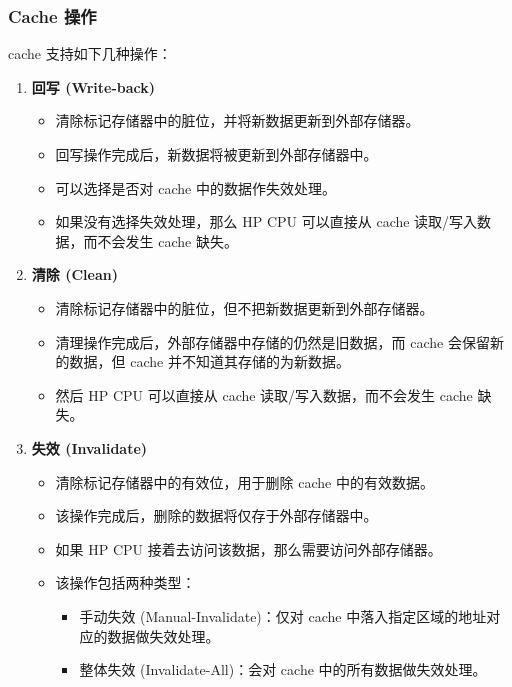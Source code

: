 \documentclass[main\_\_CN.tex]{subfiles}
\begin{document}
\subsubsection{Cache 操作}

\chipname{} cache 支持如下几种操作：

\begin{enumerate}
\item \textbf{回写 (Write-back)}
\begin{itemize}
    \item 清除标记存储器中的脏位，并将新数据更新到外部存储器。
    \item 回写操作完成后，新数据将被更新到外部存储器中。
    \item 可以选择是否对 cache 中的数据作失效处理。
    \item 如果没有选择失效处理，那么 HP CPU 可以直接从 cache 读取/写入数据，而不会发生 cache 缺失。
\end{itemize}

\item \textbf{清除 (Clean)}
\begin{itemize}
    \item 清除标记存储器中的脏位，但不把新数据更新到外部存储器。
    \item 清理操作完成后，外部存储器中存储的仍然是旧数据，而 cache 会保留新的数据，但 cache 并不知道其存储的为新数据。
    \item 然后 HP CPU 可以直接从 cache 读取/写入数据，而不会发生 cache 缺失。
\end{itemize}

\item \textbf{失效 (Invalidate)}
\begin{itemize}
    \item 清除标记存储器中的有效位，用于删除 cache 中的有效数据。
    \item 该操作完成后，删除的数据将仅存于外部存储器中。
    \item 如果 HP CPU 接着去访问该数据，那么需要访问外部存储器。
    \item 该操作包括两种类型：
    \begin{itemize}
    \item 手动失效 (Manual-Invalidate)：仅对 cache 中落入指定区域的地址对应的数据做失效处理。
    \item 整体失效 (Invalidate-All)：会对 cache 中的所有数据做失效处理。
    \end{itemize}
\end{itemize}


\end{enumerate}
\end{document}
